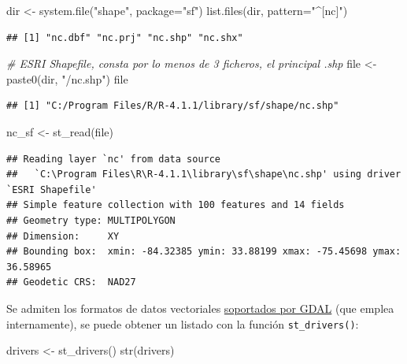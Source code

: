 \documentclass[
  spanish,
]{book}
\newenvironment{Shaded}{\begin{snugshade}}{\end{snugshade}}
\newcommand{\AttributeTok}[1]{\textcolor[rgb]{0.77,0.63,0.00}{#1}}
\newcommand{\CommentTok}[1]{\textcolor[rgb]{0.56,0.35,0.01}{\textit{#1}}}
\newcommand{\FunctionTok}[1]{\textcolor[rgb]{0.00,0.00,0.00}{#1}}
\newcommand{\NormalTok}[1]{#1}
\newcommand{\OtherTok}[1]{\textcolor[rgb]{0.56,0.35,0.01}{#1}}
\newcommand{\StringTok}[1]{\textcolor[rgb]{0.31,0.60,0.02}{#1}}
\theoremstyle{break}
\begin{document}
\begin{Shaded}
\begin{Highlighting}[]
\NormalTok{dir }\OtherTok{\textless{}{-}} \FunctionTok{system.file}\NormalTok{(}\StringTok{"shape"}\NormalTok{, }\AttributeTok{package=}\StringTok{"sf"}\NormalTok{)}
\FunctionTok{list.files}\NormalTok{(dir, }\AttributeTok{pattern=}\StringTok{"\^{}[nc]"}\NormalTok{)}
\end{Highlighting}
\end{Shaded}

\begin{verbatim}
## [1] "nc.dbf" "nc.prj" "nc.shp" "nc.shx"
\end{verbatim}

\begin{Shaded}
\begin{Highlighting}[]
\CommentTok{\# ESRI Shapefile, consta por lo menos de 3 ficheros, el principal .shp}
\NormalTok{file }\OtherTok{\textless{}{-}} \FunctionTok{paste0}\NormalTok{(dir, }\StringTok{"/nc.shp"}\NormalTok{)}
\NormalTok{file}
\end{Highlighting}
\end{Shaded}

\begin{verbatim}
## [1] "C:/Program Files/R/R-4.1.1/library/sf/shape/nc.shp"
\end{verbatim}

\begin{Shaded}
\begin{Highlighting}[]
\NormalTok{nc\_sf }\OtherTok{\textless{}{-}} \FunctionTok{st\_read}\NormalTok{(file)}
\end{Highlighting}
\end{Shaded}

\begin{verbatim}
## Reading layer `nc' from data source 
##   `C:\Program Files\R\R-4.1.1\library\sf\shape\nc.shp' using driver `ESRI Shapefile'
## Simple feature collection with 100 features and 14 fields
## Geometry type: MULTIPOLYGON
## Dimension:     XY
## Bounding box:  xmin: -84.32385 ymin: 33.88199 xmax: -75.45698 ymax: 36.58965
## Geodetic CRS:  NAD27
\end{verbatim}

Se admiten los formatos de datos vectoriales \href{https://gdal.org/drivers/vector/index.html}{soportados por GDAL} (que emplea internamente),
se puede obtener un listado con la función \texttt{st\_drivers()}:

\begin{Shaded}
\begin{Highlighting}[]
\NormalTok{drivers }\OtherTok{\textless{}{-}} \FunctionTok{st\_drivers}\NormalTok{()}
\FunctionTok{str}\NormalTok{(drivers)}
\end{Highlighting}
\end{Shaded}
\end{document}
